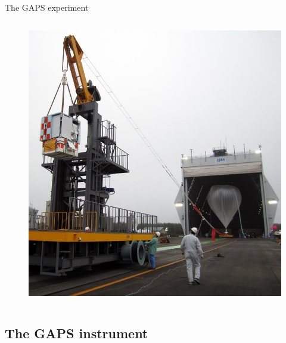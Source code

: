 \documentclass[aspectratio=169,xcolor=dvipsnames]{beamer}
\begin{document}
{\begin{frame}{The GAPS experiment}
\begin{columns}
        \begin{figure}
        \centering
        \includegraphics[height=0.64\textheight]{images/experiment_intro/gaps_balloon.jpg}
        \end{figure}
    \end{columns}
\end{frame}
}

\subsection{The GAPS instrument}
\end{document}

